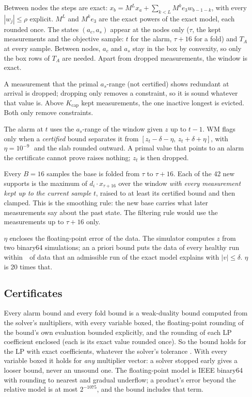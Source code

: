 Between nodes the steps are exact:
$x_b = M^L x_a + \sum_{k<L} M^k e_3 w_{b-1-k}$, with every $|w_j|\le\rho$ explicit. $M^L$ and $M^k e_3$ are the exact
powers of the exact model, each rounded once. The states $(a_c, a_s)$ appear at the nodes only ($\tau$, the kept
measurements and the objective sample: $t$ for the alarm, $\tau+16$ for a fold) and $T_A$ at every sample. Between nodes, $a_c$ and $a_s$ stay in the
box by convexity, so only the box rows of $T_A$ are needed. Apart from dropped measurements, the window is exact.

A measurement that the primal $a_s$-range (not
certified) shows redundant at arrival is dropped; dropping only removes a constraint, so it is sound whatever that value
is. Above $K_{\mathrm{cap}}$ kept measurements, the one inactive longest is
evicted. Both only remove constraints.

The alarm at $t$ uses the $a_s$-range of the window given $z$ up to $t-1$. WM flags only when a \emph{certified} bound
separates it from $[z_t-\delta-\eta,\ z_t+\delta+\eta]$, with $\eta = 10^{-9}$\,\degC\ and the slab rounded outward. A
primal value that points to an alarm the certificate cannot prove raises nothing; $z_t$ is then dropped.

Every $B = 16$ samples the base is folded from $\tau$ to $\tau+16$. Each of the 42 new supports is the maximum of
$d_i\cdot x_{\tau+16}$ over the window \emph{with every measurement kept up to the current
sample $t$}, raised to at least
its certified bound and then clamped. This is the smoothing rule: the new base carries what later measurements say
about the past state. The filtering rule would use the measurements up to $\tau+16$ only.

$\eta$ encloses the floating-point error of the data. The simulator computes $z$ from two binary64 simulations; an a
priori bound puts the data of every healthy run within \,\degC\ of data that an admissible run of the exact
model explains with $|v|\le\delta$. $\eta$ is 20 times that.

\subsection{Certificates}\label{sec:cert}

Every alarm bound and every fold bound is a weak-duality bound computed from the solver's multipliers, with every
variable boxed, the floating-point rounding of the bound's own evaluation bounded explicitly, and the rounding of each
LP coefficient enclosed (each is its exact value rounded once). So the bound holds for the LP with exact coefficients,
whatever the solver's tolerance \citep{neumaier2004,jansson2004}. With every variable boxed it holds for \emph{any}
multiplier vector: a solver stopped early gives a looser bound, never an unsound one. The floating-point model is IEEE
binary64 with rounding to nearest and gradual underflow; a product's error beyond the relative model is at most
$2^{-1075}$, and the bound includes that term.

